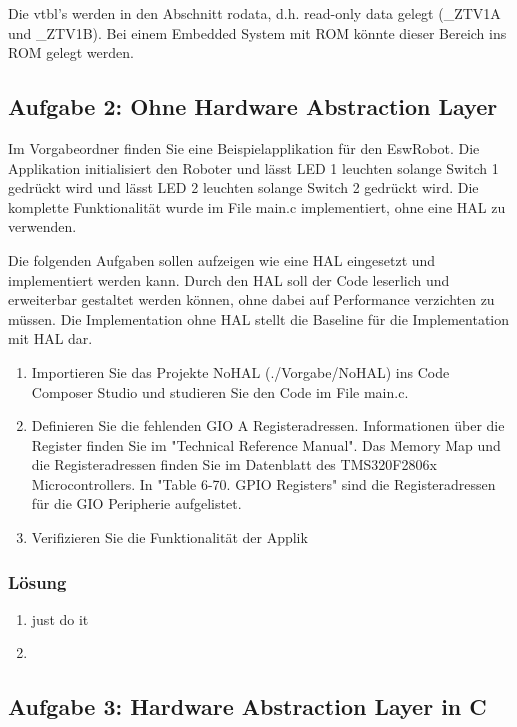 Die vtbl's werden in den Abschnitt rodata, d.h. read-only data gelegt (\_ZTV1A und \_ZTV1B). Bei einem Embedded System mit ROM könnte dieser Bereich ins ROM gelegt werden.

\subsection{Aufgabe 2: Ohne Hardware Abstraction Layer}

Im Vorgabeordner finden Sie eine Beispielapplikation für den EswRobot. Die Applikation initialisiert den Roboter
und lässt LED 1 leuchten solange Switch 1 gedrückt wird und lässt LED 2 leuchten solange Switch 2
gedrückt wird. Die komplette Funktionalität wurde im File main.c implementiert, ohne eine HAL zu verwenden.

Die folgenden Aufgaben sollen aufzeigen wie eine HAL eingesetzt und implementiert werden kann. Durch
den HAL soll der Code leserlich und erweiterbar gestaltet werden können, ohne dabei auf Performance verzichten
zu müssen. Die Implementation ohne HAL stellt die Baseline für die Implementation mit HAL dar.

\begin{enumerate}
  \item Importieren Sie das Projekte NoHAL (./Vorgabe/NoHAL) ins Code Composer Studio und studieren Sie
den Code im File main.c.
\item Definieren Sie die fehlenden GIO A Registeradressen. Informationen über die Register finden Sie im
"Technical Reference Manual". Das Memory Map und die Registeradressen finden Sie im Datenblatt des
TMS320F2806x Microcontrollers. In "Table 6-70. GPIO Registers" sind die Registeradressen für die GIO
Peripherie aufgelistet.
\item Verifizieren Sie die Funktionalität der Applik
\end{enumerate}

\subsubsection{Lösung}

\begin{enumerate}
  \item just do it
  \item 
\end{enumerate}

\subsection{Aufgabe 3: Hardware Abstraction Layer in C}

